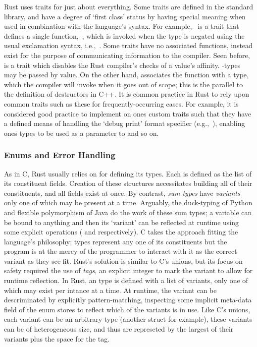 Rust uses traits for just about everything. Some traits are defined in the standard library, and have a degree of `first class' status by having special meaning when used in combination with the language's syntax. For example,~ is a trait that defines a single function,~, which is invoked when the type is negated using the usual exclamation syntax, i.e.,\ . Some traits have no associated functions, instead exist for the purpose of communicating information to the compiler. Seen before,~ is a trait which disables the Rust compiler's checks of a value's affinity. -types may be passed by value. On the other hand,  associates the  function with a type, which the compiler will invoke when it goes out of scope; this is the parallel to the definition of destructors in C++. It is common practice in Rust to rely upon common traits such as these for frequently-occurring cases. For example, it is considered good practice to implement  on ones custom traits such that they have a defined means of handling the `debug print' format specifier (e.g.,\ ), enabling ones types to be used as a parameter to  and so on.

\subsubsection{Enums and Error Handling}
As in C, Rust usually relies on  for defining its types. Each is defined as the list of its constituent fields. Creation of these structures necessitates building all of their constituents, and all fields exist at once. By contrast, \textit{sum types} have \textit{variants} only one of which may be present at a time. Arguably, the duck-typing of Python and flexible polymorphism of Java do the work of these sum types; a variable can be bound to anything and then its `variant' can be reflected at runtime using some explicit operations ( and  respectively). C takes the approach fitting the language's philosophy;  types represent any one of its constituents but the program is at the mercy of the programmer to interact with it as the correct variant as they see fit. Rust's solution is similar to C's unions, but its focus on safety required the use of \textit{tags}, an explicit integer to mark the variant to allow for runtime reflection. In Rust, an  type is defined with a list of variants, only one of which may exist per intance at a time. At runtime, the variant can be descriminated by explicitly pattern-matching, inspecting some implicit meta-data field of the enum stores to reflect which of the variants is in use. Like C's unions, each variant can be an arbitrary type (another struct for example), these variants can be of heterogeneous size, and thus are represeted by the largest of their variants plus the space for the tag. 

